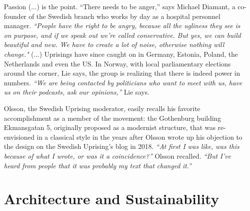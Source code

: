 \documentclass[a4paper]{article}
\begin{document}
Passion (...) is the point. “There needs to be anger,” says Michael Diamant, a co-founder of the Swedish branch who works by day as a hospital personnel manager. \textit{“People have the right to be angry, because all the ugliness they see is on purpose, and if we speak out we’re called conservative. But yes, we can build beautiful and new. We have to create a lot of noise, otherwise nothing will change." }(...) Uprisings have since caught on in Germany, Estonia, Poland, the Netherlands and even the US. In Norway, with local parliamentary elections around the corner, Lie says, the group is realizing that there is indeed power in numbers. \textit{“We are being contacted by politicians who want to meet with us, have us on their podcasts, ask our opinions,”} Lie says.

Olsson, the Swedish Uprising moderator, easily recalls his favorite accomplishment as a member of the movement: the Gothenburg building Ekmansgatan 5, originally proposed as a modernist structure, that was re-envisioned in a classical style in the years after Olsson wrote up his objection to the design on the Swedish Uprising’s blog in 2018. \textit{“At first I was like, was this because of what I wrote, or was it a coincidence?”} Olsson recalled. \textit{“But I’ve heard from people that it was probably my text that changed it.”}

\clearpage

\section{Architecture and Sustainability}
\end{document}
